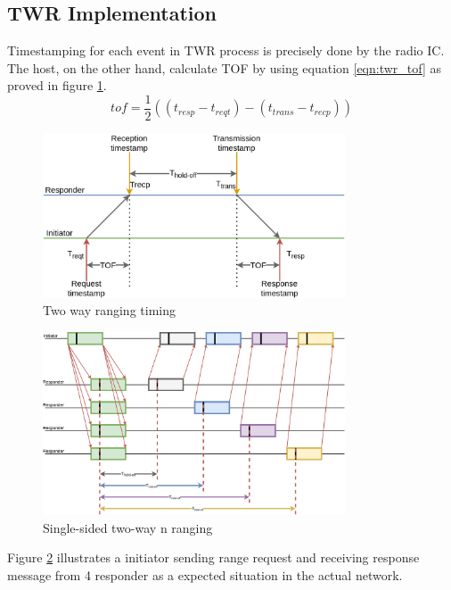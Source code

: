 \documentclass[\main/thesis.tex]{subfiles}
\begin{document}
\subsection{TWR Implementation}
Timestamping for each event in TWR process is precisely done by the radio IC. The host, on the other hand, calculate TOF by using equation \ref{eqn:twr_tof} as proved in figure \ref{fig:twr_timing}.
\begin{equation}
    tof = \frac{1}{2} ((t_{resp} - t_{reqt}) - (t_{trans} - t_{recp}))
    \label{eqn:twr_tof}
\end{equation}
\begin{figure}[H]
    \begin{center}
        \includegraphics[width=0.8\textwidth]{twr_timing.png}
    \end{center}
    \caption{Two way ranging timing}
    \label{fig:twr_timing}
\end{figure}

\begin{figure}[H]
    \begin{center}
        \includegraphics[width=0.8\textwidth]{single_sided_two_way_nranging.png}
    \end{center}
    \caption{Single-sided two-way n ranging}
    \label{fig:single_sided_two_way_nranging}
\end{figure}
Figure \ref{fig:single_sided_two_way_nranging} illustrates a initiator sending range request and receiving response message from 4 responder as a expected situation in the actual network.
\end{document}

